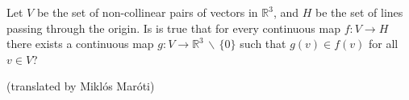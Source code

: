 Let $V$ be the set of non-collinear pairs of vectors in $\mathbb{R}^3$, and $H$ be the set of lines passing through the origin. Is is true that for every continuous map $f\colon V\rightarrow H$ there exists a continuous map $g\colon V\rightarrow \mathbb{R}^3\,\backslash\,\{ 0\}$ such that $g(v)\in f(v)$ for all $v\in V$?

(translated by Miklós Maróti)